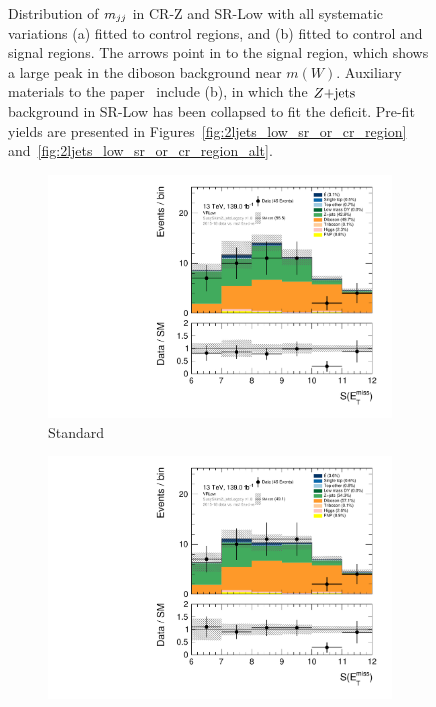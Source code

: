 \begin{figure}[tp]
\begin{subfigure}{0.48\textwidth}
\end{subfigure}
\caption[
Distribution of $\mjj$ in CR-Z and SR-Low with all systematic variations
]{%
Distribution of $\mjj$ in CR-Z and SR-Low with all systematic variations
(a) fitted to control regions, and (b) fitted to control and signal regions.
The arrows point in to the signal region, which shows a large peak in the
diboson background near $m(W)$.
Auxiliary materials to the paper~\cite{atlas2022searches} include (b), in which
the $Z\mathrm{+jets}$ background in SR-Low has been collapsed to fit the deficit.
Pre-fit yields are presented in Figures~\ref{fig:2ljets_low_sr_or_cr_region}
and~\ref{fig:2ljets_low_sr_or_cr_region_alt}.
}
\label{fig:2ljets_low_crz_pre_post}
\end{figure}

\begin{figure}[tp]
\centering
\begin{subfigure}{0.48\textwidth}
\centering
\includegraphics[width=\textwidth]{figures/2ljets_vrlow_met_Sign_VRLow.pdf}
\caption{Standard}
\end{subfigure}
\hfill
\begin{subfigure}{0.48\textwidth}
\centering
\includegraphics[width=\textwidth]{figures/2ljets_vrlow_met_Sign_VRLow_mg5.pdf}

\end{subfigure}
\end{figure}
